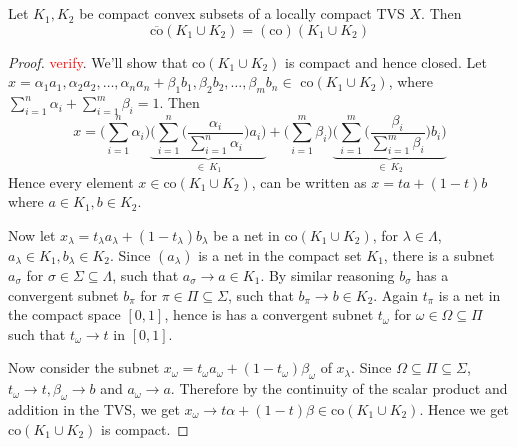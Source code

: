 
\chapter{}

\begin{lemma}
  Let $K_1, K_2$ be compact convex subsets of a locally compact TVS $X$. Then \[
    \overline{\textrm{co}}(K_1 \cup K_2) = (\textrm{co})( K_1 \cup K_2)
  \]
  \label{lem:convex_hull_of_the union_of_compact_convex_sets_are_compact}
\end{lemma}
\begin{proof}
  \textcolor{red}{verify}.
  We'll show that $\textrm{co}(K_1 \cup K_2)$ is compact and hence
  closed. Let $x = \alpha_1a_1 , \alpha_2a_2 , \ldots , \alpha_na_n +
  \beta_1b_1 , \beta_2b_2 , \ldots , \beta_mb_n \in \textrm{ co}(K_1
  \cup K_2)$, where $\sum_{i = 1}^{n} \alpha_i + \sum_{i = 1}^{m}
  \beta_i = 1$. Then \[
    x = \big(\sum_{i = 1}^{n} \alpha_i\big) \underbrace{\Bigg(
        \sum_{i = 1}^{n} \Big( \frac{\alpha_i}{\sum_{i = 1}^{n}
    \alpha_i}\Big) a_i\Bigg)}_{\in \ K_1}+ \big(\sum_{i = 1}^{m}
    \beta_i \big) \underbrace{\Bigg( \sum_{i = 1}^{m} \Big(
    \frac{\beta_i}{\sum_{i = 1}^{m} \beta_i}\Big) b_i\Bigg)}_{\in \ K_2}
  \]
  Hence every element $x \in \textrm{co}(K_1 \cup K_2)$, can be
  written as $x = ta + (1-t)b$ where $ a \in K_1, b \in K_2$.

  Now let $x_\lambda = t_\lambda a_\lambda + (1-t_\lambda)b_\lambda$
  be a net in $\textrm{co}(K_1 \cup K_2)$, for $  \lambda \in
  \Lambda$, $a_\lambda \in K_1, b_\lambda \in K_2$. Since
  $(a_\lambda)$ is a net in the compact set $K_1$, there is a subnet
  $a_\sigma$ for $\sigma \in \Sigma \subseteq \Lambda$, such that
  $a_\sigma \to a \in K_1$. By similar reasoning $b_\sigma$ has a
  convergent subnet $b_\pi$ for $\pi \in \Pi \subseteq \Sigma$, such
  that $b_\pi \to b \in K_2$. Again $t_\pi$ is a net in the compact
  space $[0, 1]$, hence is has a convergent subnet $t_\omega$ for $
  \omega \in \Omega \subseteq \Pi$ such that $t_\omega \to t$ in $[0, 1]$.

  Now consider the subnet $x_\omega = t_\omega a_\omega +
  (1-t_\omega)\beta_\omega$ of $x_\lambda$. Since $ \Omega \subseteq
  \Pi \subseteq \Sigma$, $t_\omega \to t, \beta_\omega \to b$ and
  $a_\omega \to a$. Therefore by the continuity of the scalar product
  and addition in the TVS, we get $x_\omega \to t \alpha + (1-t)
  \beta \in \textrm{co}(K_1 \cup K_2)$. Hence we get $\textrm{co}(K_1
  \cup K_2)$ is compact.
\end{proof}

